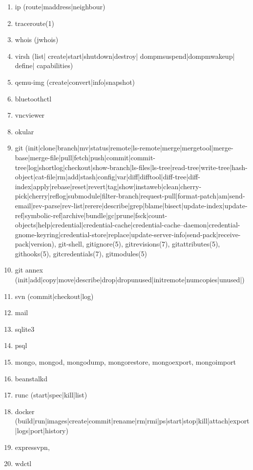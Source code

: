 \documentclass{article}
\begin{document}
\begin{enumerate}
\begin{enumerate}
            \item ip (route|maddress|neighbour)
            \item traceroute(1)
            \item whois (jwhois)
            \item virsh (list|
                       create|start|shutdown|destroy|
                       dompmsuspend|dompmwakeup|
                       define|
                       capabilities)
            \item qemu-img (create|convert|info|snapshot)
            \item bluetoothctl
            \item vncviewer
            \item okular
            \item git (init|clone|branch|mv|status|remote|ls-remote|merge|mergetool|merge-base|merge-file|pull|fetch|push|commit|commit-tree|log|shortlog|checkout|show-branch|ls-files|ls-tree|read-tree|write-tree|hash-object|cat-file|rm|add|stash|config|var|diff|difftool|diff-tree|diff-index|apply|rebase|reset|revert|tag|show|instaweb|clean|cherry-pick|cherry|reflog|submodule|filter-branch|request-pull|format-patch|am|send-email|rev-parse|rev-list|rerere|describe|grep|blame|bisect|update-index|update-ref|symbolic-ref|archive|bundle|gc|prune|fsck|count-objects|help|credential|credential-cache|credential-cache--daemon|credential-gnome-keyring|credential-store|replace|update-server-info|send-pack|receive-pack|version), git-shell, gitignore(5), gitrevisions(7), gitattributes(5), githooks(5), gitcredentials(7), gitmodules(5)
            \item git annex (init|add|copy|move|describe|drop|dropunused|initremote|numcopies|unused|)
            \item svn (commit|checkout|log)
            \item mail
            \item sqlite3
            \item psql
            \item mongo, mongod, mongodump, mongorestore, mongoexport, mongoimport
            \item beanstalkd
            \item runc (start|spec|kill|list)
            \item docker (build|run|images|create|commit|rename|rm|rmi|ps|start|stop|kill|attach|export|logs|port|history)
            \item expressvpn,
            \item wdctl

\end{enumerate}
\end{enumerate}
\end{document}
